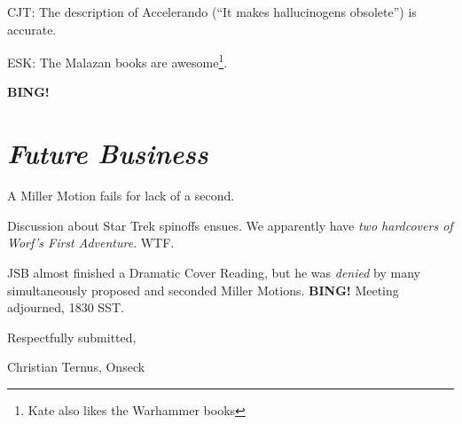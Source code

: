 \documentclass[10pt]{article}
\newcommand{\bing}{{\bf BING!} }
\newcommand{\goto}[1]{\bing \vskip 12pt \section*{{\em{#1}}}}
\begin{document}
CJT: The description of Accelerando (``It makes hallucinogens obsolete'') is accurate.

ESK: The Malazan books are awesome\footnote{Kate also likes the Warhammer books}.

\goto{Future Business}

A Miller Motion fails for lack of a second.

Discussion about Star Trek spinoffs ensues.  We apparently have \emph{two hardcovers of Worf's First Adventure}.  WTF.

JSB almost finished a Dramatic Cover Reading, but he was \emph{denied} by many simultaneously proposed and seconded Miller Motions.
\bing
\noindent
Meeting adjourned, 1830 SST.

\vspace{18pt}

\centerline{Respectfully submitted,}
\centerline{Christian Ternus, Onseck}
\end{document}

